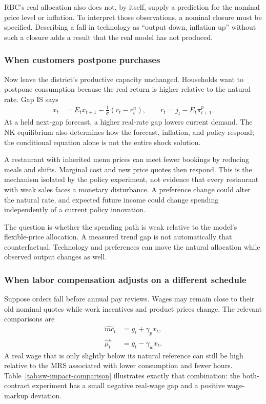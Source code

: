 RBC's real allocation also does not, by itself, supply a prediction for the
nominal price level or inflation. To interpret those observations, a nominal
closure must be specified. Describing a fall in technology as ``output down,
inflation up'' without such a closure adds a result that the real model has
not produced.

\subsubsection{When customers postpone purchases}

Now leave the district's productive capacity unchanged. Households want to
postpone consumption because the real return is higher relative to the
natural rate. Gap IS says
\begin{align}
 x_t&=E_tx_{t+1}-\frac1\sigma(r_t-r_t^n),\qquad
 r_t=j_t-E_t\pi_{t+1}^p.
\end{align}
At a held next-gap forecast, a higher real-rate gap lowers current demand.
The NK equilibrium also determines how the forecast, inflation, and policy
respond; the conditional equation alone is not the entire shock solution.

A restaurant with inherited menu prices can meet fewer bookings by reducing
meals and shifts. Marginal cost and new price quotes then respond. This is the
mechanism isolated by the policy experiment, not evidence that every restaurant
with weak sales faces a monetary disturbance. A preference change could alter
the natural rate, and expected future income could change spending independently
of a current policy innovation.

The question is whether the spending path is weak relative to the model's
flexible-price allocation. A measured trend gap is not automatically that
counterfactual. Technology and preferences can move the natural allocation
while observed output changes as well.

\subsubsection{When labor compensation adjusts on a different schedule}

Suppose orders fall before annual pay reviews. Wages may remain close to their
old nominal quotes while work incentives and product prices change. The relevant
comparisons are
\begin{align}
 \hat{mc}_t&=g_t+\gamma_p x_t,\\
 \hat\mu_t^w&=g_t-\gamma_wx_t.
\end{align}
A real wage that is only slightly below its natural reference can still be
high relative to the MRS associated with lower consumption and fewer hours.
Table~\ref{tab:sw-impact-comparison} illustrates exactly that combination:
the both-contract experiment has a small negative real-wage gap and a positive
wage-markup deviation.

